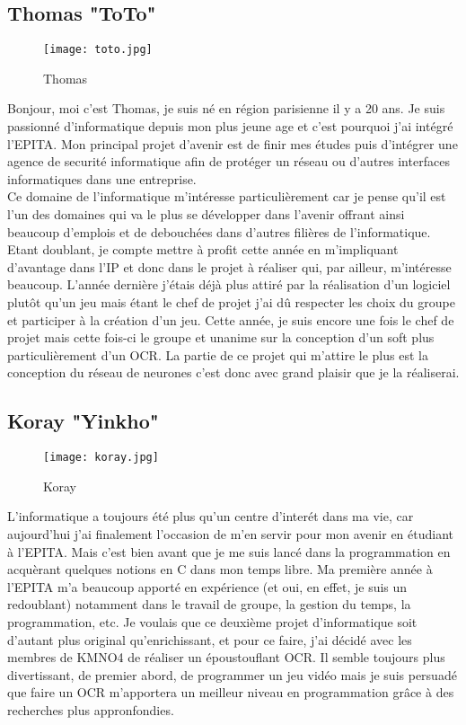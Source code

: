 \documentclass{article}
\begin{document}
             \subsection{Thomas "ToTo"}
    \begin{figure}[hp]
	    \centering
	    \texttt{[image: toto.jpg]}
	    \caption{Thomas}
    \end{figure}
Bonjour, moi c'est Thomas, je suis né en région parisienne il y a 20 ans. Je suis passionné
d'informatique depuis mon plus jeune age et c'est pourquoi j'ai intégré l'EPITA.
Mon principal projet d'avenir est de finir mes études puis d'intégrer une agence de
securité informatique afin de protéger un réseau ou d'autres interfaces informatiques
dans une entreprise.\\
Ce domaine de l'informatique m'intéresse particulièrement car je pense qu'il est
l'un des domaines qui va le plus se développer dans l'avenir offrant ainsi beaucoup
d'emplois et de debouchées dans d'autres filières de l'informatique.
Etant doublant, je compte mettre à profit cette année en m'impliquant d'avantage
dans l'IP et donc dans le projet à réaliser qui, par ailleur, m'intéresse beaucoup. L'année
dernière j'étais déjà plus attiré par la réalisation d'un logiciel plutôt qu'un jeu mais
étant le chef de projet j'ai dû respecter les choix du groupe et participer à la création
d'un jeu. Cette année, je suis encore une fois le chef de projet mais cette fois-ci le
groupe et unanime sur la conception d'un soft plus particulièrement d'un OCR. La partie
de ce projet qui m'attire le plus est la conception du réseau de neurones c'est donc
avec grand plaisir que je la réaliserai.\\

             \subsection{Koray "Yinkho"}
    \begin{figure}[hp]
	    \centering
	    \texttt{[image: koray.jpg]}
	    \caption{Koray}
    \end{figure}
L'informatique a toujours été plus qu'un centre d'interét dans ma vie, car aujourd'hui
j'ai finalement l'occasion de m'en servir pour mon avenir en étudiant à
l'EPITA. Mais c'est bien avant que je me suis lancé dans la programmation en acquèrant
quelques notions en C dans mon temps libre. Ma première année à l'EPITA
m'a beaucoup apporté en expérience (et oui, en effet, je suis un redoublant) notamment
dans le travail de groupe, la gestion du temps, la programmation, etc. Je voulais que
ce deuxième projet d'informatique soit d'autant plus original qu'enrichissant, et pour
ce faire, j'ai décidé avec les membres de KMNO4 de réaliser un époustouflant OCR. Il
semble toujours plus divertissant, de premier abord, de programmer un jeu vidéo mais
je suis persuadé que faire un OCR m'apportera un meilleur niveau en programmation
grâce à des recherches plus appronfondies.\\
\end{document}
